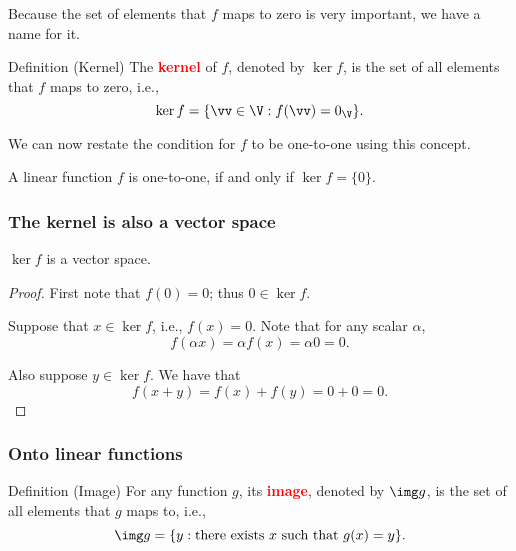 \begin{frame}

Because the set of elements that $f$ maps to zero is very important,
we have a name for it.

\begin{block}{Definition (Kernel)}
The \textcolor{red}{\bf kernel} of $f$, denoted by $\ker f$, is the
set of all elements that $f$ maps to zero, i.e.,
\[
\ker f = \{\vv\in\V : f(\vv) = 0_\V\}.
\]
\end{block}

We can now restate the condition for $f$ to be one-to-one using this
concept.

\begin{lemma}
  A linear function $f$ is one-to-one, if and only if $\ker f=\{0\}$.
\end{lemma}

\end{frame}

\begin{frame}
\frametitle{The kernel is also a vector space}

\begin{lemma}
  $\ker f$ is a vector space.
\end{lemma}
\begin{proof}
  \pause
  First note that $f(0)=0$; thus $0\in\ker f$.

  \pause
  Suppose that $x\in\ker f$, i.e., $f(x)=0$.  Note that for any scalar
  $\alpha$,
  \[
  f(\alpha x) = \alpha f(x) = \alpha 0 = 0.
  \]

  \pause
  Also suppose $y\in\ker f$.  We have that
  \[
  f(x+y) = f(x) + f(y) = 0 + 0 = 0.
  \]
\end{proof}
\end{frame}

\begin{frame}
\frametitle{Onto linear functions}

\begin{block}{Definition (Image)}
For any function $g$, its \textcolor{red}{\bf image}, denoted by $\img g$, is the set of all
elements that $g$ maps to, i.e.,
\[
\img g = \{y : \mbox{there exists $x$ such that $g(x)=y$}\}.
\]
\end{block}

\end{frame}

